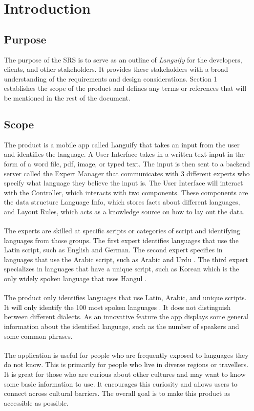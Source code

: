 \section{Introduction}
\label{sec:introduction}


\subsection{Purpose}
\label{sub:purpose}
The purpose of the SRS is to serve as an outline of \textit{Languify} for the developers, clients, and other stakeholders. It provides these stakeholders with a broad understanding of the requirements and design considerations. Section 1 establishes the scope of the product and defines any terms or references that will be mentioned in the rest of the document.


\subsection{Scope}
\label{sub:scope}
The product is a mobile app called Languify that takes an input from the user and identifies the language. 
A User Interface takes in a written text input in the form of a word file, pdf, image, or typed text. 
The input is then sent to a backend server called the Expert Manager that communicates with 3 different experts who specify what language they believe the input is. 
The User Interface will interact with the Controller, which interacts with two components.
These components are the data structure Language Info, which stores facts about different languages, and Layout Rules, which acts as a knowledge source on how to lay out the data.\\ \\
The experts are skilled at specific scripts or categories of script and identifying languages from those groups. The first expert identifies languages that use the Latin script, such as English and German. 
The second expert specifies in languages that use the Arabic script, such as Arabic and Urdu \cite{1}. The third expert specializes in languages that have a unique script, such as Korean which is the only widely spoken language that uses Hangul \cite{2}. \\ \\
The product only identifies languages that use Latin, Arabic, and unique scripts. It will only identify the 100 most spoken languages \cite{3}. It does not distinguish between different dialects. As an innovative feature the app displays some general information about the identified language, such as the number of speakers and some common phrases.\\ \\
The application is useful for people who are frequently exposed to languages they do not know. This is primarily for people who live in diverse regions or travellers. It is great for those who are curious about other cultures and may want to know some basic information to use. It encourages this curiosity and allows users to connect across cultural barriers. The overall goal is to make this product as accessible as possible.


